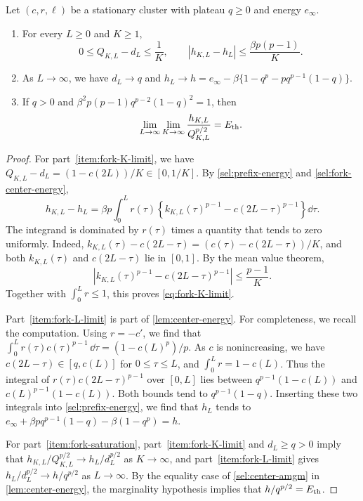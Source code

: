 \begin{lemma}
\label{lem:fork-parameter-limits}
Let $(c,r,\ell)$ be a stationary cluster with plateau $q\ge0$ and energy
$e_\infty$.
\begin{enumerate}[label=(\roman*)]
\item\label{item:fork-K-limit}
For every $L\ge0$ and $K\ge1$,
\begin{equation}\label{eq:fork-K-limit}
 0\le Q_{K,L}-d_L\le\frac1K,\qquad
 |h_{K,L}-h_L|\le\frac{\beta p(p-1)}K.
\end{equation}
\item\label{item:fork-L-limit}
As $L\to\infty$, we have $d_L\to q$ and
$h_L\to h=e_\infty-\beta\{1-q^p-pq^{p-1}(1-q)\}$.
\item\label{item:fork-saturation}
If $q>0$ and $\beta^2p(p-1)q^{p-2}(1-q)^2=1$, then
\begin{equation}\label{sel:fork-saturation}
 \lim_{L\to\infty}\lim_{K\to\infty}\frac{h_{K,L}}{Q_{K,L}^{p/2}}=E_{\mathrm{th}}.
\end{equation}
\end{enumerate}
\end{lemma}

\begin{proof}
For part~\ref{item:fork-K-limit}, we have
$Q_{K,L}-d_L=(1-c(2L))/K\in[0,1/K]$. By \eqref{sel:prefix-energy} and
\eqref{sel:fork-center-energy},
\[
 h_{K,L}-h_L=\beta p\int_0^Lr(\tau)
 \left\{k_{K,L}(\tau)^{p-1}-c(2L-\tau)^{p-1}\right\}\dd\tau.
\]
The integrand is dominated by $r(\tau)$ times a quantity that tends to zero
uniformly. Indeed, $k_{K,L}(\tau)-c(2L-\tau)=(c(\tau)-c(2L-\tau))/K$, and both
$k_{K,L}(\tau)$ and $c(2L-\tau)$ lie in $[0,1]$. By the mean value theorem,
\[
 \left|k_{K,L}(\tau)^{p-1}-c(2L-\tau)^{p-1}\right|\le\frac{p-1}K.
\]
Together with $\int_0^Lr\le1$, this proves \eqref{eq:fork-K-limit}.

Part~\ref{item:fork-L-limit} is part of \cref{lem:center-energy}. For
completeness, we recall the computation. Using $r=-c'$, we find that
$\int_0^Lr(\tau)c(\tau)^{p-1}\,\dd\tau=(1-c(L)^p)/p$. As $c$ is
nonincreasing, we have $c(2L-\tau)\in[q,c(L)]$ for $0\le\tau\le L$, and $\int_0^Lr=1-c(L)$. Thus the integral of
$r(\tau)c(2L-\tau)^{p-1}$ over $[0,L]$ lies between $q^{p-1}(1-c(L))$ and $c(L)^{p-1}(1-c(L))$. Both bounds
tend to $q^{p-1}(1-q)$. Inserting these two integrals into
\eqref{sel:prefix-energy}, we find that $h_L$ tends to
$e_\infty+\beta pq^{p-1}(1-q)-\beta(1-q^p)=h$.

For part~\ref{item:fork-saturation}, part~\ref{item:fork-K-limit} and
$d_L\ge q>0$ imply that $h_{K,L}/Q_{K,L}^{p/2}\to h_L/d_L^{p/2}$ as $K\to\infty$,
and part~\ref{item:fork-L-limit} gives $h_L/d_L^{p/2}\to h/q^{p/2}$ as
$L\to\infty$. By the equality case of \eqref{sel:center-amgm} in
\cref{lem:center-energy}, the marginality hypothesis implies that
$h/q^{p/2}=E_{\mathrm{th}}$.
\end{proof}

